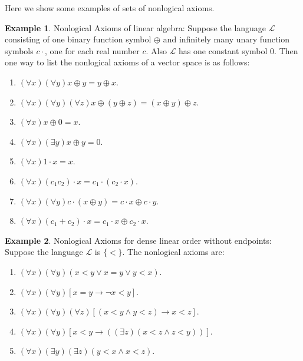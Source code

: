 \documentclass[11pt,letterpaper]{book}
\theoremstyle{definition}
\newtheorem{example}{Example}[section]
\begin{document}
Here we show some examples of sets of nonlogical axioms.


\begin{example}\label{zb:nonlogical_linear_algebra}
Nonlogical Axioms of linear algebra: Suppose the language $\mathcal{L}$
consisting of one binary function symbol $\oplus$ and infinitely many
unary function symbols $c\cdot$, one for each real number $c$. Also
$\mathcal{L}$ has one constant symbol $0$. Then one way to list the
nonlogical axioms of a vector space is as follows:
\begin{enumerate}
\item{ $ (\forall x) (\forall y) x \oplus y = y \oplus x $.}
\item{$ (\forall x ) (\forall y) (\forall z) x \oplus (y \oplus z) = (x
\oplus y) \oplus z $.}
\item{$(\forall x) x \oplus 0 = x$.}
\item{$(\forall x) (\exists y) x \oplus y = 0 $.}
\item{$(\forall x) 1 \cdot x = x $.}
\item{$ (\forall x) (c_1 c_2) \cdot x = c_1 \cdot (c_2 \cdot x)$.}
\item{$ (\forall x) (\forall y) c \cdot (x \oplus y) = c \cdot x \oplus
c \cdot y $.}
\item{$(\forall x) (c_1 + c_2) \cdot x = c_1 \cdot x \oplus c_2 \cdot x $.}
\end{enumerate}
\end{example}

\begin{example}\label{zb:nonlogical_dense_linear_order}
Nonlogical Axioms for dense linear order without endpoints: Suppose the
language $\mathcal{L}$ is $\{ < \}$. The nonlogical axioms are:
\begin{enumerate}
\item{ $(\forall x) (\forall y) (x < y \lor x = y \lor y < x)$. }
\item{$(\forall x)(\forall y) [ x=y \rightarrow \lnot x < y ] $.}
\item{$(\forall x)(\forall y)(\forall z) [(x < y \land y < z)
\rightarrow x < z ] $.}
\item{$(\forall x) (\forall y) [x < y \rightarrow ( (\exists z) (x < z
\land z < y) )] $. }
\item{$ (\forall x)(\exists y) (\exists z) ( y < x \land x < z ) $.}
\end{enumerate}
\end{example}
\end{document}
